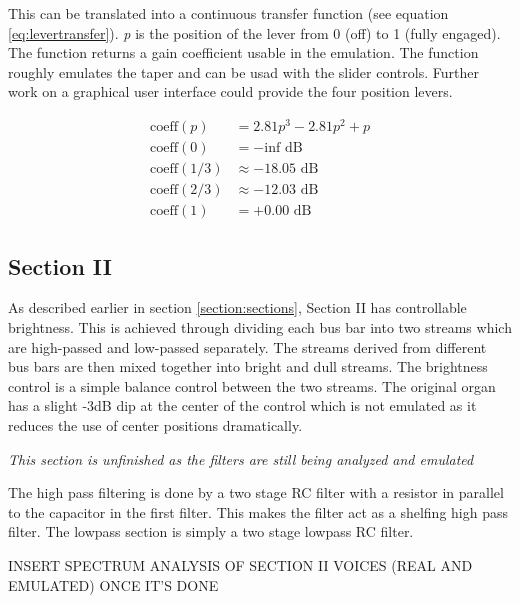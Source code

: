 \documentclass[11pt,a4paper]{article}
\begin{document}
This can be translated into a continuous transfer function (see equation \ref{eq:levertransfer}). \emph{p} is the position of the lever from 0 (off) to 1 (fully engaged). The function returns a gain coefficient usable in the emulation. The function roughly emulates the taper and can be usad with the slider controls. Further work on a graphical user interface could provide the four position levers.


\begin{equation}
\label{eq:levertransfer}
\begin{split}
\mbox{coeff}(p) &= 2.81 p^3 - 2.81 p^2 + p \\
\mbox{coeff}(0) &= -\mbox{inf} \mbox{ dB}\\
\mbox{coeff}(1/3) &\approx -18.05 \mbox{ dB}\\
\mbox{coeff}(2/3) &\approx -12.03 \mbox{ dB}\\
\mbox{coeff}(1) &= +0.00 \mbox{ dB}
\end{split}
\end{equation}



\subsection{Section II}

As described earlier in section \ref{section:sections}, Section II has controllable brightness. This is achieved through dividing each bus bar into two streams which are high-passed and low-passed separately. The streams derived from different bus bars are then mixed together into bright and dull streams. The brightness control is a simple balance control between the two streams. The original organ has a slight -3dB dip at the center of the control which is not emulated as it reduces the use of center positions dramatically.

\emph{This section is unfinished as the filters are still being analyzed and emulated}

The high pass filtering is done by a two stage RC filter with a resistor in parallel to the capacitor in the first filter. This makes the filter act as a shelfing high pass filter. The lowpass section is simply a two stage lowpass RC filter.


INSERT SPECTRUM ANALYSIS OF SECTION II VOICES (REAL AND EMULATED) ONCE IT'S DONE
\end{document}
